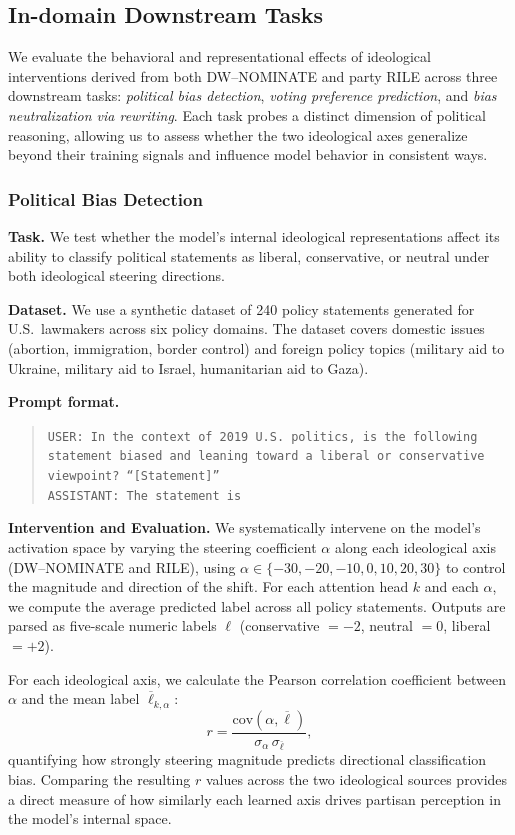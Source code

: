 \documentclass[11pt]{article}
\begin{document}
\subsection{In-domain Downstream Tasks}

We evaluate the behavioral and representational effects of ideological interventions derived from both DW--NOMINATE and party RILE across three downstream tasks: \emph{political bias detection}, \emph{voting preference prediction}, and \emph{bias neutralization via rewriting}. Each task probes a distinct dimension of political reasoning, allowing us to assess whether the two ideological axes generalize beyond their training signals and influence model behavior in consistent ways.

\subsubsection{Political Bias Detection}

\textbf{Task.} We test whether the model’s internal ideological representations affect its ability to classify political statements as liberal, conservative, or neutral under both ideological steering directions.

\textbf{Dataset.} We use a synthetic dataset of 240 policy statements generated for U.S.\ lawmakers across six policy domains. The dataset covers domestic issues (abortion, immigration, border control) and foreign policy topics (military aid to Ukraine, military aid to Israel, humanitarian aid to Gaza).

\textbf{Prompt format.}
\begin{quote}
\texttt{USER: In the context of 2019 U.S. politics, is the following statement biased and leaning toward a liberal or conservative viewpoint? ``[Statement]''}\\
\texttt{ASSISTANT: The statement is}
\end{quote}

\textbf{Intervention and Evaluation.}
We systematically intervene on the model’s activation space by varying the steering coefficient $\alpha$ along each ideological axis (DW--NOMINATE and RILE), using $\alpha \in \{-30,-20,-10,0,10,20,30\}$ to control the magnitude and direction of the shift. For each attention head $k$ and each $\alpha$, we compute the average predicted label across all policy statements. Outputs are parsed as five-scale numeric labels $\ell$ (conservative $=-2$, neutral $=0$, liberal $=+2$).

For each ideological axis, we calculate the Pearson correlation coefficient between $\alpha$ and the mean label $\overline{\ell}_{k,\alpha}$:
\begin{equation*}
    r = \frac{\mathrm{cov}(\alpha, \overline{\ell})}{\sigma_\alpha \, \sigma_{\overline{\ell}}},
\end{equation*}
quantifying how strongly steering magnitude predicts directional classification bias. Comparing the resulting $r$ values across the two ideological sources provides a direct measure of how similarly each learned axis drives partisan perception in the model’s internal space.
\end{document}

